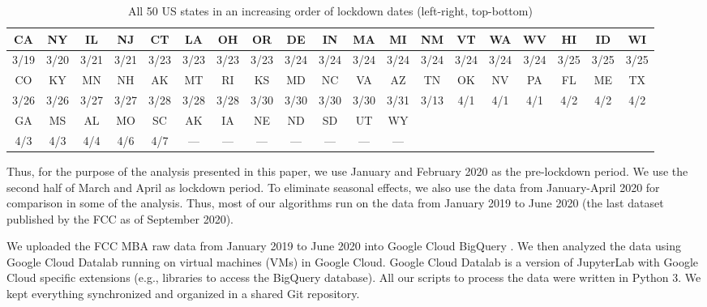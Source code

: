 \documentclass[conference,10pt]{IEEEtran}
\begin{document}
\begin{table}
  \centering
  \caption{All 50 US states in an increasing order of lockdown dates (left-right, top-bottom)}
  \label{tab:state-lockdown}
  \begin{tabular}{ |c|c|c|c|c|c|c|c|c|c|c|c|c|c|c|c|c|c|c| }
    \hline
    CA   & NY   & IL   & NJ   & CT   & LA   & OH   & OR   & DE   & IN   & MA   & MI   & NM   & VT   & WA   & WV   & HI   & ID   & WI   \\
    \hline
    3/19 & 3/20 & 3/21 & 3/21 & 3/23 & 3/23 & 3/23 & 3/23 & 3/24 & 3/24 & 3/24 & 3/24 & 3/24 & 3/24 & 3/24 & 3/24 & 3/25 & 3/25 & 3/25 \\
    \hline\hline
    CO   & KY   & MN   & NH   & AK   & MT   & RI   & KS   & MD   & NC   & VA   & AZ   & TN   & OK   & NV   & PA   & FL   & ME   & TX   \\
    \hline
    3/26 & 3/26 & 3/27 & 3/27 & 3/28 & 3/28 & 3/28 & 3/30 & 3/30 & 3/30 & 3/30 & 3/31 & 3/13 & 4/1  & 4/1  & 4/1  & 4/2  & 4/2  & 4/2  \\
    \hline\hline
    GA   & MS   & AL   & MO   & SC   & AK   & IA   & NE   & ND   & SD   & UT   & WY   & \multicolumn{7}{|c|}{}                         \\
    \hline
    4/3  & 4/3  & 4/4  & 4/6  & 4/7  & ---  & ---  & ---  & ---  & ---  & ---  & ---  & \multicolumn{7}{|c|}{}                         \\
    \hline
  \end{tabular}
\end{table}

Thus, for the purpose of the analysis presented in this paper, we use January and February 2020 as the pre-lockdown period. We use the second half of March and April as lockdown period. To eliminate seasonal effects, we also use the data from January-April 2020 for comparison in some of the analysis. Thus, most of our algorithms run on the data from January 2019 to June 2020 (the last dataset published by the FCC as of September 2020).

We uploaded the FCC MBA raw data from January 2019 to June 2020 into Google Cloud BigQuery \cite{bigquery}. We then analyzed the data using Google Cloud Datalab \cite{datalab} running on virtual machines (VMs) in Google Cloud. Google Cloud Datalab is a version of JupyterLab \cite{jupyter} with Google Cloud specific extensions (e.g., libraries to access the BigQuery database). All our scripts to process the data were written in Python 3. We kept everything synchronized and organized in a shared Git repository.
\end{document}
